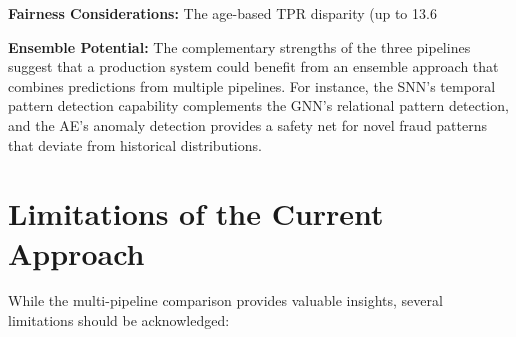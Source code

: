 \textbf{Fairness Considerations:} The age-based TPR disparity (up to 13.6%

\textbf{Ensemble Potential:} The complementary strengths of the three pipelines suggest that a production system could benefit from an ensemble approach that combines predictions from multiple pipelines. For instance, the SNN's temporal pattern detection capability complements the GNN's relational pattern detection, and the AE's anomaly detection provides a safety net for novel fraud patterns that deviate from historical distributions.

\section{Limitations of the Current Approach}

While the multi-pipeline comparison provides valuable insights, several limitations should be acknowledged:

